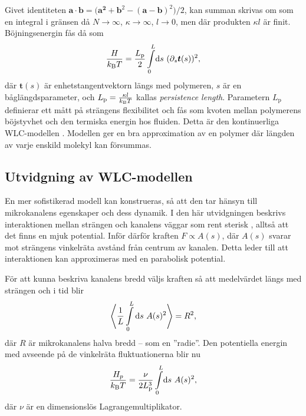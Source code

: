 Givet identiteten $\mathbf{a}\cdot\mathbf{b}=\big(\mathbf{a^2}+\mathbf{b}^2-(\mathbf{a}-\mathbf{b})^2\big)/2$, kan summan skrivas om som en integral i gränsen då $N\to\infty$, $\kappa\to\infty$, $l \to 0$, men där produkten $\kappa{}l$ är finit. Böjningsenergin fås då som 
\begin{equation}\label{böj}
    \frac{H}{\kbT}=\frac{L_\text{p}}{2}\int_{0}^{L}\!\dd{s}\,(\partial_{s}\mathbf{t}(s))^2,
\end{equation}
där $\mathbf{t}(s)$ är enhetstangentvektorn längs med polymeren, $s$ är en båglängdsparameter, och $L_\text{p}=\frac{\kappa l}{k_{\text{B}}T}$ kallas \emph{persistence length}. Parametern $L_\text{p}$ definierar ett mått på strängens flexibilitet och fås som kvoten mellan polymerens böjstyvhet och den termiska energin hos fluiden. 
Detta är den kontinuerliga WLC-modellen \cite{Fixman_WLC1973}. Modellen ger en bra approximation av en polymer där längden av varje enskild molekyl kan försummas. 



\subsection{Utvidgning av WLC-modellen} \label{WLCkanal}

En mer sofistikerad modell kan konstrueras, så att den tar hänsyn till mikrokanalens egenskaper och dess dynamik. I den här utvidgningen beskrivs interaktionen mellan strängen och kanalens väggar som rent sterisk \cite{Koster_etal2007}, alltså att det finns en mjuk potential. 
Inför därför kraften $F \propto A(s)$, där $A(s)$ svarar mot strängens vinkelräta avstånd från centrum av kanalen. Detta leder till att interaktionen kan approximeras med en parabolisk potential. 

För att kunna beskriva kanalens bredd väljs kraften så att medelvärdet längs med strängen och i tid blir
\begin{equation}\label{jäm1}
\ev{\frac{1}{L}\int_{0}^{L}\dd{s} \, A(s)^{2}}=R^2,
\end{equation}
där $R$ är mikrokanalens halva bredd -- som en ''radie''. Den potentiella energin med avseende på de vinkelräta fluktuationerna blir nu~\cite{Harnau&Reineker1999}
\begin{equation}
    \frac{H_{p}}{\kbT}=\frac{\nu}{2L_\text{p}^3}\int_{0}^{L} \!\dd{s} \, A(s)^2,
\end{equation}
där $\nu$ är en dimensionslös Lagrangemultiplikator.

